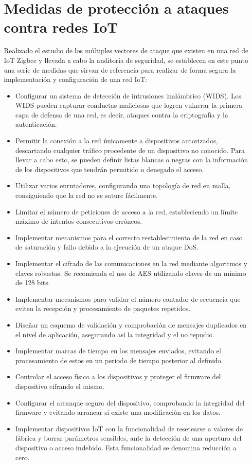 \clearpage


\section{Medidas de protección a ataques contra redes IoT} %
Realizado el estudio de los múltiples vectores de ataque que existen en una red de IoT Zigbee y llevada a cabo la auditoría de seguridad, se establecen en este punto una serie de medidas que sirvan de referencia para realizar de forma segura la implementación y configuración de una red IoT:
\begin{itemize}
\item Configurar un sistema de detección de intrusiones inalámbrico (WIDS). Los WIDS pueden capturar conductas maliciosas que logren vulnerar la primera capa de defensa de una red, es decir, ataques contra la criptografía y la autenticación.
\item Permitir la conexión a la red únicamente a dispositivos autorizados, descartando cualquier tráﬁco procedente de un dispositivo no conocido. Para llevar a cabo esto, se pueden deﬁnir listas blancas o negras con la información de los dispositivos que tendrán permitido o denegado el acceso.
\item Utilizar varios enrutadores, configurando una topología de red en malla, consiguiendo que la red no se sature fácilmente.
\item Limitar el número de peticiones de acceso a la red, estableciendo un límite máximo de intentos consecutivos erróneos.
\item Implementar mecanismos para el correcto restablecimiento de la red en caso de saturación y fallo debido a la ejecución de un ataque DoS.
\item Implementar el cifrado de las comunicaciones en la red mediante algoritmos y claves robustas. Se recomienda el uso de AES utilizando claves de un mínimo de 128 bits.
\item Implementar mecanismos para validar el número contador de secuencia que eviten la recepción y procesamiento de paquetes repetidos.
\item Diseñar un esquema de validación y comprobación de mensajes duplicados en el nivel de aplicación, asegurando así la integridad y el no repudio.
\item Implementar marcas de tiempo en los mensajes enviados, evitando el procesamiento de estos en un periodo de tiempo posterior al deﬁnido.
\item Controlar el acceso físico a los dispositivos y proteger el ﬁrmware del dispositivo cifrando el mismo.
\item Conﬁgurar el arranque seguro del dispositivo, comprobando la integridad del ﬁrmware y evitando arrancar si existe una modiﬁcación en los datos.
\item Implementar dispositivos IoT con la funcionalidad de resetearse a valores de fábrica y borrar parámetros sensibles, ante la detección de una apertura del dispositivo o acceso indebido. Esta funcionalidad se denomina reducción a cero.
\end{itemize}



\clearpage



